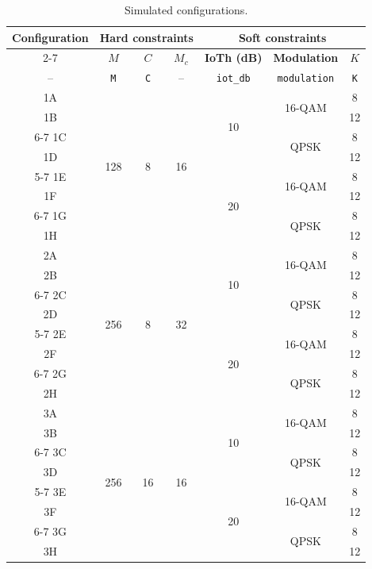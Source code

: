 \begin{table}[htbp]
\caption{Simulated configurations.}
\label{tab:paineis}
\vspace{4pt} %
\centering
\footnotesize
\renewcommand{\arraystretch}{1.2}
\setlength{\aboverulesep}{0pt}
\setlength{\belowrulesep}{0pt}
\begin{tabular}{|c|c|c|c|c|c|c|}
\toprule
\multirow{2}{*}{\textbf{Configuration}} & \multicolumn{3}{c|}{\textbf{Hard constraints}} & \multicolumn{3}{c|}{\textbf{Soft constraints}} \\
\cline{2-7}
 & {\boldmath $M$} & {\boldmath $C$} & {\boldmath $M_c$} & \textbf{IoTh (dB)} & \textbf{Modulation} & {\boldmath $K$} \\
-- & \texttt{M} & \texttt{C} & -- & \texttt{iot\_db} & \texttt{modulation} & \texttt{K} \\
\midrule
1A & \multirow{8}{*}{128} & \multirow{8}{*}{8} & \multirow{8}{*}{16} & \multirow{4}{*}{10} & \multirow{2}{*}{16-QAM} & 8 \\
1B & & & & & & 12 \\
\cline{6-7}
1C & & & & & \multirow{2}{*}{QPSK} & 8 \\
1D & & & & & & 12 \\
\cline{5-7}
1E & & & & \multirow{4}{*}{20} & \multirow{2}{*}{16-QAM} & 8 \\
1F & & & & & & 12 \\
\cline{6-7}
1G & & & & & \multirow{2}{*}{QPSK} & 8 \\
1H & & & & & & 12 \\
\midrule
2A & \multirow{8}{*}{256} & \multirow{8}{*}{8} & \multirow{8}{*}{32} & \multirow{4}{*}{10} & \multirow{2}{*}{16-QAM} & 8 \\
2B & & & & & & 12 \\
\cline{6-7}
2C & & & & & \multirow{2}{*}{QPSK} & 8 \\
2D & & & & & & 12 \\
\cline{5-7}
2E & & & & \multirow{4}{*}{20} & \multirow{2}{*}{16-QAM} & 8 \\
2F & & & & & & 12 \\
\cline{6-7}
2G & & & & & \multirow{2}{*}{QPSK} & 8 \\
2H & & & & & & 12 \\
\midrule
3A & \multirow{8}{*}{256} & \multirow{8}{*}{16} & \multirow{8}{*}{16} & \multirow{4}{*}{10} & \multirow{2}{*}{16-QAM} & 8 \\
3B & & & & & & 12 \\
\cline{6-7}
3C & & & & & \multirow{2}{*}{QPSK} & 8 \\
3D & & & & & & 12 \\
\cline{5-7}
3E & & & & \multirow{4}{*}{20} & \multirow{2}{*}{16-QAM} & 8 \\
3F & & & & & & 12 \\
\cline{6-7}
3G & & & & & \multirow{2}{*}{QPSK} & 8 \\
3H & & & & & & 12 \\
\bottomrule
\end{tabular}


\end{table}
